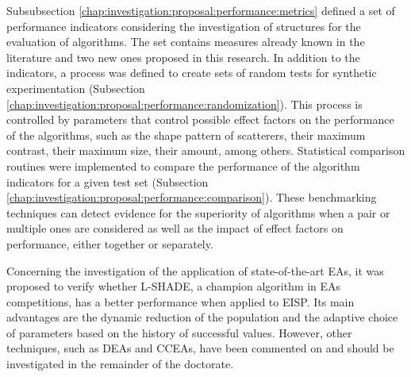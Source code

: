 		Subsubsection \ref{chap:investigation:proposal:performance:metrics} defined a set of performance indicators considering the investigation of structures for the evaluation of algorithms. The set contains measures already known in the literature and two new ones proposed in this research. In addition to the indicators, a process was defined to create sets of random tests for synthetic experimentation (Subsection \ref{chap:investigation:proposal:performance:randomization}). This process is controlled by parameters that control possible effect factors on the performance of the algorithms, such as the shape pattern of scatterers, their maximum contrast, their maximum size, their amount, among others. Statistical comparison routines were implemented to compare the performance of the algorithm indicators for a given test set (Subsection \ref{chap:investigation:proposal:performance:comparison}). These benchmarking techniques can detect evidence for the superiority of algorithms when a pair or multiple ones are considered as well as the impact of effect factors on performance, either together or separately.
		
		Concerning the investigation of the application of state-of-the-art EAs, it was proposed to verify whether L-SHADE, a champion algorithm in EAs competitions, has a better performance when applied to EISP. Its main advantages are the dynamic reduction of the population and the adaptive choice of parameters based on the history of successful values. However, other techniques, such as DEAs and CCEAs, have been commented on and should be investigated in the remainder of the doctorate.
		

